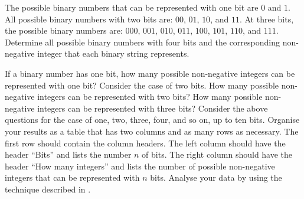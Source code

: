 \documentclass[a4paper,oneside,12pt]{article}
\begin{document}
\begin{problem}
\begin{packedenum}
  \item\label{subprob:exponential:binary_4_bits}
    The possible binary numbers that can be represented with one bit
    are $0$ and $1$.  All possible binary numbers with two bits are:
    $00$, $01$, $10$, and $11$.  At three bits, the possible binary
    numbers are: $000$, $001$, $010$, $011$, $100$, $101$, $110$, and
    $111$.  Determine all possible binary numbers with four bits and
    the corresponding non-negative integer that each binary string
    represents.

  \item\label{subprob:exponential:binary_how_many_integers}
    If a binary number has one bit, how many possible non-negative
    integers can be represented with one bit?  Consider the case of
    two bits.  How many possible non-negative integers can be
    represented with two bits?  How many possible non-negative
    integers can be represented with three bits?  Consider the above
    questions for the case of one, two, three, four, and so on, up to
    ten bits.  Organise your results as a table that has two columns
    and as many rows as necessary.  The first row should contain the
    column headers.  The left column should have the header ``Bits''
    and lists the number $n$ of bits.  The right column should have
    the header ``How many integers'' and lists the number of possible
    non-negative integers that can be represented with $n$
    bits. Analyse your data by using the technique described in
    .


\end{packedenum}
\end{problem}
\end{document}
